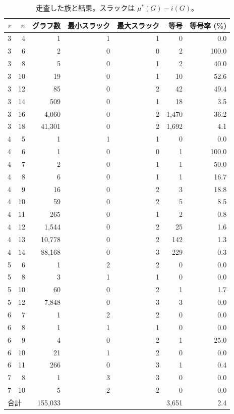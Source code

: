 \documentclass[paper=a4,fontsize=10.5pt,jafontsize=10.5pt]{jlreq}
\theoremstyle{plain}
\theoremstyle{definition}
\begin{document}
\begin{table}[htbp]
\centering
\caption{走査した族と結果。スラックは $\mu^*(G) - i(G)$。}
\label{tab:families}
\begin{tabular}{rrrrrrr}
\toprule
$r$ & $n$ & グラフ数 & 最小スラック & 最大スラック & 等号 & 等号率 (\%) \\
\midrule
3 & 4 & 1 & 1 & 1 & 0 & 0.0 \\
3 & 6 & 2 & 0 & 0 & 2 & 100.0 \\
3 & 8 & 5 & 0 & 1 & 2 & 40.0 \\
3 & 10 & 19 & 0 & 1 & 10 & 52.6 \\
3 & 12 & 85 & 0 & 2 & 42 & 49.4 \\
3 & 14 & 509 & 0 & 1 & 18 & 3.5 \\
3 & 16 & 4,060 & 0 & 2 & 1,470 & 36.2 \\
3 & 18 & 41,301 & 0 & 2 & 1,692 & 4.1 \\
4 & 5 & 1 & 1 & 1 & 0 & 0.0 \\
4 & 6 & 1 & 0 & 0 & 1 & 100.0 \\
4 & 7 & 2 & 0 & 1 & 1 & 50.0 \\
4 & 8 & 6 & 0 & 1 & 1 & 16.7 \\
4 & 9 & 16 & 0 & 2 & 3 & 18.8 \\
4 & 10 & 59 & 0 & 2 & 5 & 8.5 \\
4 & 11 & 265 & 0 & 1 & 2 & 0.8 \\
4 & 12 & 1,544 & 0 & 2 & 25 & 1.6 \\
4 & 13 & 10,778 & 0 & 2 & 142 & 1.3 \\
4 & 14 & 88,168 & 0 & 3 & 229 & 0.3 \\
5 & 6 & 1 & 2 & 2 & 0 & 0.0 \\
5 & 8 & 3 & 1 & 1 & 0 & 0.0 \\
5 & 10 & 60 & 0 & 2 & 1 & 1.7 \\
5 & 12 & 7,848 & 0 & 3 & 3 & 0.0 \\
6 & 7 & 1 & 2 & 2 & 0 & 0.0 \\
6 & 8 & 1 & 1 & 1 & 0 & 0.0 \\
6 & 9 & 4 & 0 & 2 & 1 & 25.0 \\
6 & 10 & 21 & 1 & 2 & 0 & 0.0 \\
6 & 11 & 266 & 0 & 3 & 1 & 0.4 \\
7 & 8 & 1 & 3 & 3 & 0 & 0.0 \\
7 & 10 & 5 & 2 & 2 & 0 & 0.0 \\
\midrule
\multicolumn{2}{l}{合計} & 155,033 & & & 3,651 & 2.4 \\
\bottomrule
\end{tabular}
\end{table}
\end{document}
